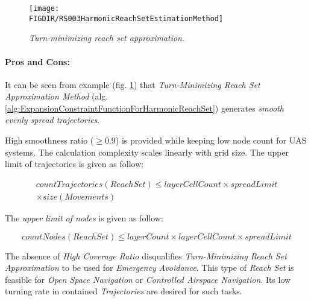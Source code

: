 \begin{figure}[H]
    \centering
    \texttt{[image: \\FIGDIR/RS003HarmonicReachSetEstimationMethod]} 
    \caption{\emph{Turn-minimizing \emph{reach set} approximation}.}
    \label{fig:harmonicReachSetApproximation}
\end{figure}

\paragraph{Pros and Cons:} It can be seen from example (fig. \ref{fig:harmonicReachSetApproximation}) that \emph{Turn-Minimizing Reach Set Approximation Method} (alg. \ref{alg:ExpansionConstraintFunctionForHarmonicReachSet}) generates \emph{smooth evenly spread trajectories}.
    
High smoothness ratio ($\ge 0.9$) is provided while keeping low node count for UAS systems. The calculation complexity scales linearly with grid size. The upper limit of trajectories is given as follow:

\begin{multline}
    countTrajectories(ReachSet) \le layerCellCount \times spreadLimit \\\times size(Movements)
\end{multline}

\noindent The \emph{upper limit of nodes} is given as follow:

\begin{equation}
    countNodes(ReachSet) \le layerCount \times layerCellCount \times spreadLimit
\end{equation}

\noindent The absence of \emph{High Coverage Ratio} disqualifies \emph{Turn-Minimizing Reach Set Approximation} to be used for \emph{Emergency Avoidance}. This type of \emph{Reach Set} is feasible for \emph{Open Space Navigation} or \emph{Controlled Airspace Navigation}. Its low turning rate in contained \emph{Trajectories} are desired for such tasks. 



